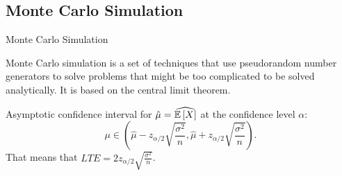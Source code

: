 \subsection{Monte Carlo Simulation}
    \begin{frame}{Monte Carlo Simulation}
        \begin{definition}
            Monte Carlo simulation is a set of techniques that use pseudorandom number generators to solve problems that might be too complicated to be solved analytically. It is based on the central limit theorem.
        \end{definition}
        Asymptotic confidence interval for $\hat{\mu} = \widehat{\mathbb{E}\left[X\right]}$ at the confidence level $\alpha$:
        \begin{equation}
            \mu \in \left(\hat{\mu} - z_{\alpha/2} \sqrt{\frac{\sigma^2}{n}}, \hat{\mu} + z_{\alpha/2} \sqrt{\frac{\sigma^2}{n}}\right).
        \end{equation}
        That means that $LTE = 2z_{\alpha/2} \sqrt{\frac{\sigma^2}{n}}$.
    \end{frame}